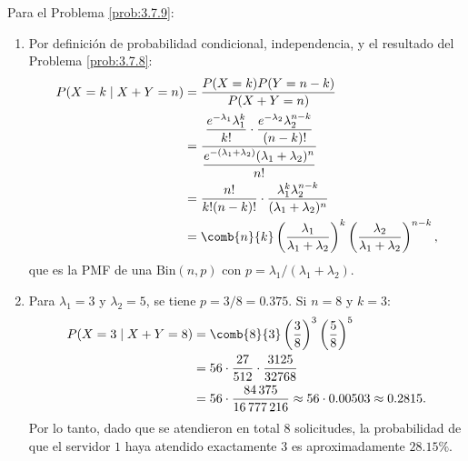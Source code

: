 \begin{solucion}
	\label{sol:3.7.9}
	Para el Problema \ref{prob:3.7.9}:
	\begin{enumerate}
		\item Por definición de probabilidad condicional, independencia, y el resultado del Problema \ref{prob:3.7.8}:
		\begin{align*}
			P(X = k \mid X + Y = n) &= \dfrac{P(X = k) P(Y = n-k)}{P(X + Y = n)} \\
			&= \dfrac{\dfrac{e^{-\lambda_{1}} \lambda_{1}^{k}}{k!} \cdot \dfrac{e^{-\lambda_{2}} \lambda_{2}^{n-k}}{(n-k)!}}{\dfrac{e^{-(\lambda_{1}+\lambda_{2})} (\lambda_{1} + \lambda_{2})^{n}}{n!}} \\
			&= \dfrac{n!}{k! (n-k)!} \cdot \dfrac{\lambda_{1}^{k} \lambda_{2}^{n-k}}{(\lambda_{1} + \lambda_{2})^{n}} \\
			&= \comb{n}{k} \left(\dfrac{\lambda_{1}}{\lambda_{1} + \lambda_{2}}\right)^{k} \left(\dfrac{\lambda_{2}}{\lambda_{1} + \lambda_{2}}\right)^{n-k},
		\end{align*}
		que es la PMF de una $\text{Bin}(n, p)$ con $p = \lambda_{1}/(\lambda_{1} + \lambda_{2})$.
		\item Para $\lambda_{1} = 3$ y $\lambda_{2} = 5$, se tiene $p = 3/8 = 0.375$. Si $n = 8$ y $k = 3$:
		\begin{align*}
			P(X = 3 \mid X + Y = 8) &= \comb{8}{3} \left(\dfrac{3}{8}\right)^{3} \left(\dfrac{5}{8}\right)^{5} \\
			&= 56 \cdot \dfrac{27}{512} \cdot \dfrac{3125}{32768} \\
			&= 56 \cdot \dfrac{84\,375}{16\,777\,216} \approx 56 \cdot 0.00503 \approx 0.2815.
		\end{align*}
		Por lo tanto, dado que se atendieron en total $8$ solicitudes, la probabilidad de que el servidor $1$ haya atendido exactamente $3$ es aproximadamente $28.15\%$.
	\end{enumerate}
\end{solucion}


